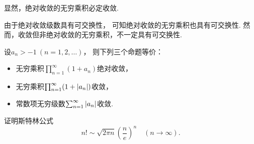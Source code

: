 显然，绝对收敛的无穷乘积必定收敛.

由于绝对收敛级数具有可交换性，
可知绝对收敛的无穷乘积也具有可交换性.
然而，收敛但非绝对收敛的无穷乘积，不一定具有可交换性.

\begin{theorem}
设\(a_n>-1\ (n=1,2,\dotsc)\)，
则下列三个命题等价：\begin{itemize}
	\item 无穷乘积\(\prod_{n=1}^\infty (1+a_n)\)绝对收敛，
	\item 无穷乘积\(\prod_{n=1}^\infty (1+\abs{a_n})\)收敛，
	\item 常数项无穷级数\(\sum_{n=1}^\infty \abs{a_n}\)收敛.
\end{itemize}
\end{theorem}

\begin{example}\label{example:无穷乘积.斯特林公式}
证明斯特林公式\begin{equation}
	n! \sim \sqrt{2\pi n} \left( \frac{n}{e} \right)^n
	\quad(n\to\infty).
\end{equation}
\end{example}
